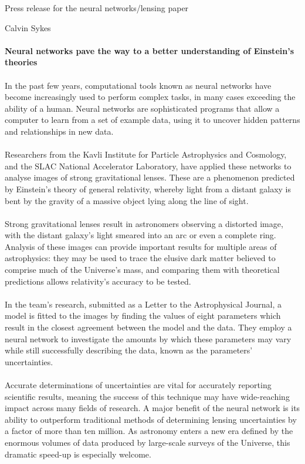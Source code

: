 \documentclass{minimal}
\begin{document}
Press release for the neural networks/lensing paper

Calvin Sykes\\
\\
\textbf{Neural networks pave the way to a better understanding of Einstein's theories}\\
\\
In the past few years, computational tools known as neural networks have become increasingly used to perform complex tasks, in many cases exceeding the ability of a human.
Neural networks are sophisticated programs that allow a computer to learn from a set of example data, using it to uncover hidden patterns and relationships in new data.\\
\\
Researchers from the Kavli Institute for Particle Astrophysics and Cosmology, and the SLAC National Accelerator Laboratory, have applied these networks to analyse images of strong gravitational lenses.
These are a phenomenon predicted by Einstein's theory of general relativity, whereby light from a distant galaxy is bent by the gravity of a massive object lying along the line of sight.\\
\\
Strong gravitational lenses result in astronomers observing a distorted image, with the distant galaxy's light smeared into an arc or even a complete ring.
Analysis of these images can provide important results for multiple areas of astrophysics: they may be used to trace the elusive dark matter believed to comprise much of the Universe's mass, and comparing them with theoretical predictions allows relativity's accuracy to be tested.\\
\\
In the team's research, submitted as a Letter to the Astrophysical Journal, a model is fitted to the images by finding the values of eight parameters which result in the closest agreement between the model and the data.
They employ a neural network to investigate the amounts by which these parameters may vary while still successfully describing the data, known as the parameters' uncertainties.\\
\\
Accurate determinations of uncertainties are vital for accurately reporting scientific results, meaning the success of this technique may have wide-reaching impact across many fields of research.
A major benefit of the neural network is its ability to outperform traditional methods of determining lensing uncertainties by a factor of more than ten million.
As astronomy enters a new era defined by the enormous volumes of data produced by large-scale surveys of the Universe, this dramatic speed-up is especially welcome.
\end{document}
